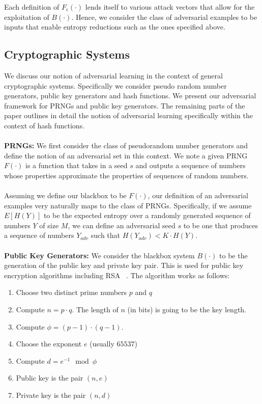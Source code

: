 \documentclass[letterpaper,twocolumn,10pt]{article}
\begin{document}
Each definition of $F_{\epsilon}(\cdot)$ lends itself to various attack vectors that allow for the exploitation of $B(\cdot)$. Hence, we consider the class of adversarial examples to be inputs that enable entropy reductions such as the ones specified above. 

\subsection{Cryptographic Systems} \label{sec:cryptosys}
We discuss our notion of adversarial learning in the context of general cryptographic systems. Specifically we consider pseudo random number generators, public key generators and hash functions. We present our adversarial framework for PRNGs and public key generators. The remaining parts of the paper outlines in detail the notion of adversarial learning specifically within the context of hash functions. 
\\
\\
\textbf{PRNGs:} We first consider the class of pseudorandom number generators and define the notion of an adversarial set in this context. We note a given PRNG $F(\cdot)$ is a function that takes in a seed $s$ and outputs a sequence of numbers whose properties approximate the properties of sequences of random numbers.
\\
\\
Assuming we define our blackbox to be $F(\cdot)$, our definition of an adversarial examples very naturally maps to the class of PRNGs. Specifically, if we assume $E[H(Y)]$ to be the expected entropy over a randomly generated sequence of numbers $Y$ of size $M$, we can define an adversarial seed $s$ to be one that produces a sequence of numbers $Y_{adv}$ such that $H(Y_{adv}) < K \cdot H(Y)$. 
\\
\\
\textbf{Public Key Generators:} We consider the blackbox system $B(\cdot)$ to be the generation of the public key and private key pair. This is used for public key encryption algorithms including RSA ~\cite{katz2014introduction}. The algorithm works as follows:

\begin{enumerate}
\item Choose two distinct prime numbers $p$ and $q$
\item Compute $n = p \cdot q$. The length of $n$ (in bits) is going to be the key length.
\item Compute $ \phi = (p-1) \cdot (q-1)$.
\item Choose the exponent $e$ (usually $65537$)
\item Compute $d = e^{-1} \mod \phi$
\item Public key is the pair $(n, e)$
\item Private key is the pair $(n, d)$
\end{enumerate}
\end{document}

